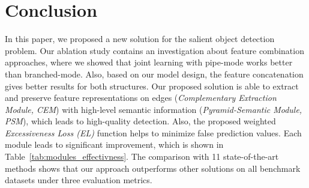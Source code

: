 \documentclass[10pt,twocolumn,letterpaper]{article}
\begin{document}
\section{Conclusion}
In this paper, we proposed a new solution for the salient object detection problem. Our ablation study contains an investigation about feature combination approaches, where we showed that joint learning with pipe-mode works better than branched-mode. Also, based on our model design, the feature concatenation gives better results for both structures. Our proposed solution is able to extract and preserve feature representations on edges (\textit{Complementary Extraction Module, CEM}) with high-level semantic information (\textit{Pyramid-Semantic Module, PSM}), which leads to high-quality detection. Also, the proposed weighted \textit{Excessiveness Loss (EL)} function helps to minimize false prediction values. Each module leads to significant improvement, which is shown in Table~\ref{tab:modules_effectivness}. The comparison with 11 state-of-the-art methods shows that our approach outperforms other solutions on all benchmark datasets under three evaluation metrics.

{\small


}
\end{document}
